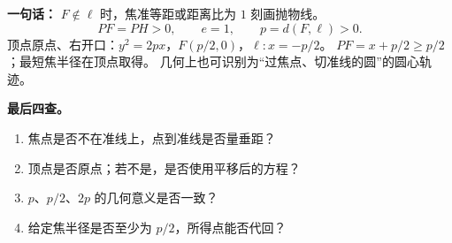\begin{summarybox}
\textbf{一句话：} $F\notin\ell$ 时，焦准等距或距离比为 $1$ 刻画抛物线。
\[
PF=PH>0,\qquad e=1,\qquad p=d(F,\ell)>0.
\]
顶点原点、右开口：$y^2=2px$，$F(p/2,0)$，$\ell:x=-p/2$。
$PF=x+p/2\ge p/2$；最短焦半径在顶点取得。
几何上也可识别为“过焦点、切准线的圆”的圆心轨迹。

\textbf{最后四查。}
\begin{enumerate}[leftmargin=*]
\item 焦点是否不在准线上，点到准线是否量垂距？
\item 顶点是否原点；若不是，是否使用平移后的方程？
\item $p$、$p/2$、$2p$ 的几何意义是否一致？
\item 给定焦半径是否至少为 $p/2$，所得点能否代回？
\end{enumerate}
\end{summarybox}


